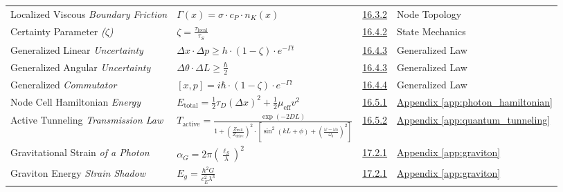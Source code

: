 \begin{longtable}{@{} p{4.5cm} p{6cm} c p{4cm} @{}}
Localized Viscous \newline \textit{Boundary Friction} & $\Gamma(x) = \sigma \cdot c_P \cdot n_K(x)$ & \hyperref[sec:16.3.2]{16.3.2} & Node Topology \\

Certainty Parameter \newline \textit{($\zeta$)} & $\zeta = \frac{\tau_{\text{local}}}{\tau_S}$ & \hyperref[sec:16.4.2]{16.4.2} & State Mechanics \\

Generalized Linear \newline \textit{Uncertainty} & $\Delta x \cdot \Delta p \geq h \cdot (1 - \zeta) \cdot e^{-\Gamma t}$ & \hyperref[sec:16.4.3]{16.4.3} & Generalized Law \\

Generalized Angular \newline \textit{Uncertainty} & $\Delta \theta \cdot \Delta L \geq \frac{\hbar}{2}$ & \hyperref[sec:16.4.3]{16.4.3} & Generalized Law \\

Generalized \newline \textit{Commutator} & $[x,p] = i\hbar \cdot (1 - \zeta) \cdot e^{-\Gamma t}$ & \hyperref[sec:16.4.4]{16.4.4} & Generalized Law \\

Node Cell Hamiltonian \newline \textit{Energy} & $E_{\text{total}} = \frac{1}{2} \tau_D (\Delta x)^2 + \frac{1}{2} \mu_{\text{eff}} v^2$ & \hyperref[sec:16.5.1]{16.5.1} & \hyperref[app:photon_hamiltonian]{Appendix \ref*{app:photon_hamiltonian}} \\

Active Tunneling \newline \textit{Transmission Law} & $T_{\text{active}} = \frac{\exp(-2DL)}{1 + \left(\frac{Z_{\text{wall}}}{Z_{\text{drive}}}\right)^2 \cdot \left[\sin^2(kL+\phi) + \left(\frac{\omega-\omega_0}{\omega_0}\right)^2\right]}$ & \hyperref[sec:16.5.2]{16.5.2} & \hyperref[app:quantum_tunneling]{Appendix \ref*{app:quantum_tunneling}} \\

Gravitational Strain \newline \textit{of a Photon} & $\alpha_G = 2\pi\left(\frac{\ell_S}{\lambda}\right)^2$ & \hyperref[sec:17.2.1]{17.2.1} & \hyperref[app:graviton]{Appendix \ref*{app:graviton}} \\

Graviton Energy \newline \textit{Strain Shadow} & $E_g = \frac{h^2 G}{c_E^2 \lambda^3}$ & \hyperref[sec:17.2.1]{17.2.1} & \hyperref[app:graviton]{Appendix \ref*{app:graviton}} \\


\end{longtable}
